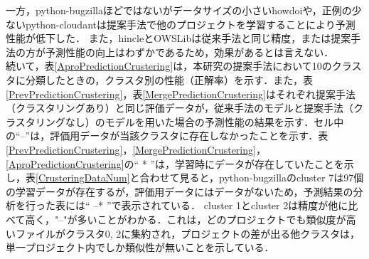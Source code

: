 \documentclass[T,J]{fose} %
\newcommand{\todo}[1]{\colorbox{yellow}{{\bf TODO}:}{\color{red} {\textbf{[#1]}}}}
\begin{document}
一方，python-bugzillaほどではないがデータサイズの小さいhowdoiや，正例の少ないpython-cloudantは提案手法で他のプロジェクトを学習することにより予測性能が低下した．
また，hincleとOWSLibは従来手法と同じ精度，または提案手法の方が予測性能の向上はわずかであるため，効果があるとは言えない．\\




%
%

続いて，表\ref{AproPredictionCrustering}は，本研究の提案手法において10のクラスタに分類したときの，クラスタ別の性能（正解率）を示す．また，表\ref{PrevPredictionCrustering}，表\ref{MergePredictionCrustering}はそれぞれ提案手法（クラスタリングあり）と同じ評価データが，従来手法のモデルと提案手法（クラスタリングなし）のモデルを用いた場合の予測性能の結果を示す．セル中の``--''は，評価用データが当該クラスタに存在しなかったことを示す．表\ref{PrevPredictionCrustering}，\ref{MergePredictionCrustering}，\ref{AproPredictionCrustering}の`` * ''は，学習時にデータが存在していたことを示し，表\ref{CrusteringDataNum}と合わせて見ると，python-bugzillaのcluster 7は97個の学習データが存在するが，評価用データにはデータがないため，予測結果の分析を行った表には`` --* ''で表示されている．
cluster 1とcluster 2は精度が他に比べて高く，"--"が多いことがわかる．これは，どのプロジェクトでも類似度が高いファイルがクラスタ0, 2に集約され，プロジェクトの差が出る他クラスタは，単一プロジェクト内でしか類似性が無いことを示している．

\end{document}
